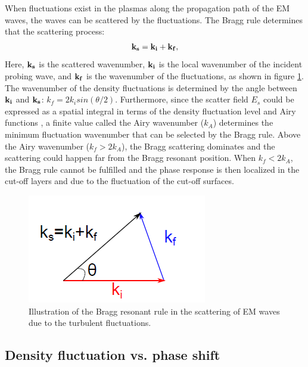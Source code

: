 When fluctuations exist in the plasmas along the propagation path of the EM waves, the waves can be scattered by the fluctuations. The Bragg rule determines that the scattering process:%
\begin{equation}\label{eq:Bragg_rule}
  \boldsymbol{\mathrm{k_s}} = \boldsymbol{\mathrm{k_i}} + \boldsymbol{\mathrm{k_f}},
\end{equation}
\noindent Here, $\boldsymbol{\mathrm{k_s}}$ is the scattered wavenumber, $\boldsymbol{\mathrm{k_i}}$  is the local wavenumber of the incident probing wave, and $\boldsymbol{\mathrm{k_f}}$ is the wavenumber of the fluctuations, as shown in figure \ref{fig:Brag_rule}. The wavenumber of the density fluctuations is determined by the angle between $\boldsymbol{\mathrm{k_i}}$ and $\boldsymbol{\mathrm{k_s}}$: $k_f = 2k_isin(\theta/2)$. Furthermore, since the scatter field $E_s$ could be expressed as a spatial integral in terms of the density fluctuation level and Airy functions \cite{Zou_1991_PPCF,Fanack_1996_PPCF}, a finite value called the Airy wavenumber ($k_A$) determines the minimum fluctuation wavenumber that can be selected by the Bragg rule. Above the Airy wavenumber ($k_f > 2k_A$), the Bragg scattering dominates and the scattering could happen far from the Bragg resonant position. When $k_f < 2k_A$, the Bragg rule cannot be fulfilled and the phase response is then localized in the cut-off layers and due to the fluctuation of the cut-off surfaces.


\begin{figure}[h]
\begin{centering}
\includegraphics[scale=0.75]{Brag_rule.png}
\par\end{centering}
\caption{Illustration of the Bragg resonant rule in the scattering of EM waves due to the turbulent fluctuations.}
\label{fig:Brag_rule}
\end{figure}


\subsection{Density fluctuation vs. phase shift} \label{sec:dphi2dn}


